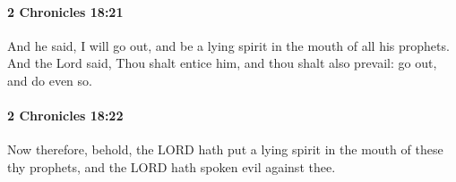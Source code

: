 		\paragraph{2 Chronicles 18:21} %
			\label{2CHRONICLES-18-21}

			And he said, I will go out, and be a lying spirit in the mouth of all his prophets. And the Lord said, Thou shalt entice him, and thou shalt also prevail: go out, and do even so.


		\paragraph{2 Chronicles 18:22} %
			\label{2CHRONICLES-18-22}

			Now therefore, behold, the LORD hath put a lying spirit in the mouth of these thy prophets, and the LORD hath spoken evil against thee.



